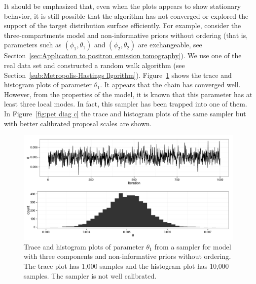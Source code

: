 It should be emphasized that, even when the plots appears to show stationary
behavior, it is still possible that the algorithm has not converged or
explored the support of the target distribution surface efficiently. For
example, consider the three-compartments \pet model and non-informative priors
without ordering (that is, parameters such as $(\phi_1,\theta_1)$ and
$(\phi_2,\theta_2)$ are exchangeable, see Section~\ref{sec:Application to
  positron emission tomography}). We use one of the real data set and
constructed a random walk algorithm (see Section~\ref{sub:Metropolis-Hastings
  llgorithm}). Figure~\ref{fig:pet diag} shows the trace and histogram plots
of parameter $\theta_1$. It appears that the \mcmc chain has converged well.
However, from the properties of the model, it is known that this parameter has
at least three local modes. In fact, this sampler has been trapped into one of
them. In Figure~\ref{fig:pet diag c} the trace and histogram plots of the same
sampler but with better calibrated proposal scales are shown.

\begin{figure}
  \includegraphics[width=\linewidth]{fig/PET_MH_Diag}
  \caption[Trace and histogram of parameters in the random walk algorithm for
  the \protect\pet compartmental model (calibrated)]
  {Trace and histogram plots of parameter $\theta_1$ from a \mcmc
    sampler for \pet model with three components and non-informative priors
    without ordering. The trace plot has 1,000 samples and the histogram plot
    has 10,000 samples. The sampler is not well calibrated.}
  \label{fig:pet diag}
\end{figure}

